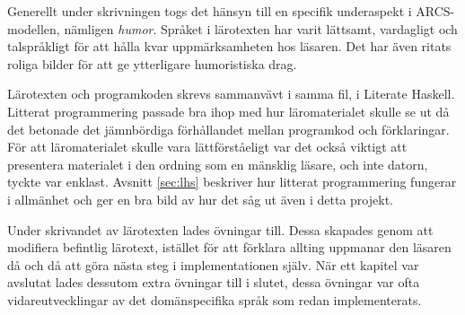 Generellt under skrivningen togs det hänsyn till en specifik underaspekt i
ARCS-modellen, nämligen \textit{humor}. Språket i lärotexten har varit lättsamt,
vardagligt och talspråkligt för att hålla kvar uppmärksamheten hos läsaren. Det
har även ritats roliga bilder för att ge ytterligare humoristiska drag.

Lärotexten och programkoden skrevs sammanvävt i samma fil, i Literate
Haskell. Litterat programmering passade bra ihop med
hur läromaterialet skulle se ut då det betonade det jämnbördiga förhållandet
mellan programkod och förklaringar. För att läromaterialet skulle vara
lättförståeligt var det också viktigt att presentera materialet i den ordning
som en mänsklig läsare, och inte datorn, tyckte var enklast. Avsnitt \ref{sec:lhs} beskriver hur litterat programmering fungerar i allmänhet och ger
en bra bild av hur det såg ut även i detta projekt.

Under skrivandet av lärotexten lades övningar till. Dessa skapades genom att
modifiera befintlig lärotext, istället för att förklara allting uppmanar den
läsaren då och då att göra nästa steg i implementationen själv. När ett kapitel
var avslutat lades dessutom extra övningar till i slutet, dessa övningar var
ofta vidareutvecklingar av det domänspecifika språk som redan implementerats.


%

